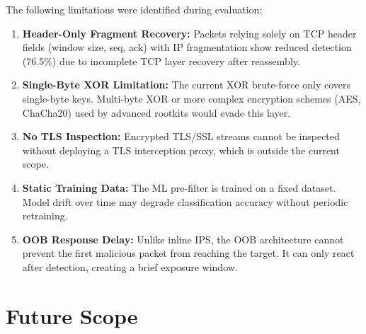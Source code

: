 The following limitations were identified during evaluation:

\begin{enumerate}
    \item \textbf{Header-Only Fragment Recovery:} Packets relying solely on TCP header fields (window size, seq, ack) with IP fragmentation show reduced detection (76.5\%) due to incomplete TCP layer recovery after reassembly.
    
    \item \textbf{Single-Byte XOR Limitation:} The current XOR brute-force only covers single-byte keys. Multi-byte XOR or more complex encryption schemes (AES, ChaCha20) used by advanced rootkits would evade this layer.
    
    \item \textbf{No TLS Inspection:} Encrypted TLS/SSL streams cannot be inspected without deploying a TLS interception proxy, which is outside the current scope.
    
    \item \textbf{Static Training Data:} The ML pre-filter is trained on a fixed dataset. Model drift over time may degrade classification accuracy without periodic retraining.
    
    \item \textbf{OOB Response Delay:} Unlike inline IPS, the OOB architecture cannot prevent the first malicious packet from reaching the target. It can only react after detection, creating a brief exposure window.
\end{enumerate}

\section{Future Scope}

